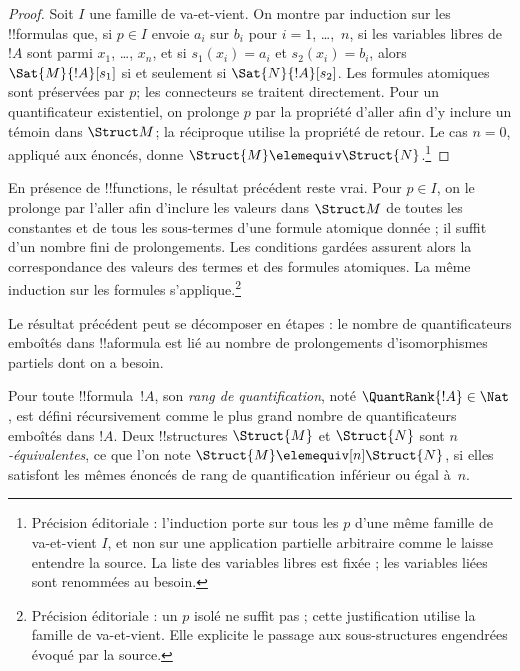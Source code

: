 \documentclass[../../../include/open-logic-section]{subfiles}
\begin{document}
\begin{proof}
  Soit $I$ une famille de va-et-vient. On montre par induction sur
  les !!{formula}s que, si $p\in I$ envoie $a_i$ sur $b_i$
  pour $i =1$, \dots,~$n$, si les variables libres de $!A$
  sont parmi $x_1$, \dots, $x_n$, et si $s_1(x_i) =a_i$
  et $s_2(x_i) =b_i$, alors $\Sat{M}{!A}[s_1]$ si et seulement
  si $\Sat{N}{!A}[s_2]$. Les formules atomiques sont préservées
  par $p$; les connecteurs se traitent directement. Pour un
  quantificateur existentiel, on prolonge $p$ par la propriété
  d'aller afin d'y inclure un témoin dans $\Struct M$; la
  réciproque utilise la propriété de retour. Le cas $n=0$,
  appliqué aux énoncés, donne
  $\Struct{M} \elemequiv \Struct{N}$.\footnote{Précision éditoriale : l'induction porte sur tous les $p$ d'une même famille de va-et-vient $I$, et non sur une application partielle arbitraire comme le laisse entendre la source. La liste des variables libres est fixée ; les variables liées sont renommées au besoin.}
\end{proof}

\begin{rem}
En présence de !!{function}s, le résultat précédent reste vrai.
Pour $p\in I$, on le prolonge par l'aller afin d'inclure les valeurs
dans $\Struct M$ de toutes les constantes et de tous les sous-termes
d'une formule atomique donnée ; il suffit d'un nombre fini de prolongements.
Les conditions gardées assurent alors la correspondance des valeurs des termes et des formules atomiques. La même induction sur les formules s'applique.\footnote{Précision éditoriale : un $p$ isolé ne suffit pas ; cette justification utilise la famille de va-et-vient. Elle explicite le passage aux sous-structures engendrées évoqué par la source.}
\end{rem}

Le résultat précédent peut se décomposer en étapes : le nombre
de quantificateurs emboîtés dans !!a{formula} est lié au nombre
de prolongements d'isomorphismes partiels dont on a besoin.

\begin{defn}
  Pour toute !!{formula}~$!A$, son \emph{rang de quantification},
  noté $\QuantRank{!A} \in \Nat$, est défini récursivement
  comme le plus grand nombre de quantificateurs emboîtés dans
  $!A$. Deux !!{structure}s $\Struct{M}$ et $\Struct{N}$ sont
  \emph{$n$-équivalentes}, ce que l'on note
  $\Struct{M} \elemequiv[n] \Struct{N}$, si elles satisfont les mêmes
  énoncés de rang de quantification inférieur ou égal à~$n$.
\end{defn}
\end{document}
